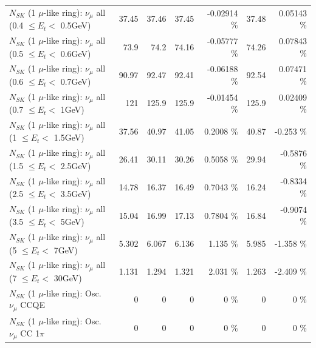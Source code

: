 \begin{table}
\begin{tabular}{| l | r | r | r  r | r  r |}
       $N_{SK}$ (1 $\mu$-like ring): $\nu_{\mu}$ all (0.4 $\leq E_{t} <$ 0.5GeV) &           37.45 &           37.46 &           37.45 & -0.02914 \%  &           37.48 &  0.05143 \%  \\ 
       $N_{SK}$ (1 $\mu$-like ring): $\nu_{\mu}$ all (0.5 $\leq E_{t} <$ 0.6GeV) &            73.9 &            74.2 &           74.16 & -0.05777 \%  &           74.26 &  0.07843 \%  \\ 
       $N_{SK}$ (1 $\mu$-like ring): $\nu_{\mu}$ all (0.6 $\leq E_{t} <$ 0.7GeV) &           90.97 &           92.47 &           92.41 & -0.06188 \%  &           92.54 &  0.07471 \%  \\ 
         $N_{SK}$ (1 $\mu$-like ring): $\nu_{\mu}$ all (0.7 $\leq E_{t} <$ 1GeV) &             121 &           125.9 &           125.9 & -0.01454 \%  &           125.9 &  0.02409 \%  \\ 
         $N_{SK}$ (1 $\mu$-like ring): $\nu_{\mu}$ all (1 $\leq E_{t} <$ 1.5GeV) &           37.56 &           40.97 &           41.05 &   0.2008 \%  &           40.87 &   -0.253 \%  \\ 
       $N_{SK}$ (1 $\mu$-like ring): $\nu_{\mu}$ all (1.5 $\leq E_{t} <$ 2.5GeV) &           26.41 &           30.11 &           30.26 &   0.5058 \%  &           29.94 &  -0.5876 \%  \\ 
       $N_{SK}$ (1 $\mu$-like ring): $\nu_{\mu}$ all (2.5 $\leq E_{t} <$ 3.5GeV) &           14.78 &           16.37 &           16.49 &   0.7043 \%  &           16.24 &  -0.8334 \%  \\ 
         $N_{SK}$ (1 $\mu$-like ring): $\nu_{\mu}$ all (3.5 $\leq E_{t} <$ 5GeV) &           15.04 &           16.99 &           17.13 &   0.7804 \%  &           16.84 &  -0.9074 \%  \\ 
           $N_{SK}$ (1 $\mu$-like ring): $\nu_{\mu}$ all (5 $\leq E_{t} <$ 7GeV) &           5.302 &           6.067 &           6.136 &    1.135 \%  &           5.985 &   -1.358 \%  \\ 
          $N_{SK}$ (1 $\mu$-like ring): $\nu_{\mu}$ all (7 $\leq E_{t} <$ 30GeV) &           1.131 &           1.294 &           1.321 &    2.031 \%  &           1.263 &   -2.409 \%  \\ 
\hline
\hline
                               $N_{SK}$ (1 $\mu$-like ring): Osc. $\nu_\mu$ CCQE &               0 &               0 &               0 &        0 \%  &               0 &        0 \%  \\ 
                          $N_{SK}$ (1 $\mu$-like ring): Osc. $\nu_\mu$ CC 1$\pi$ &               0 &               0 &               0 &        0 \%  &               0 &        0 \%  \\ 

\end{tabular}
\end{table}
